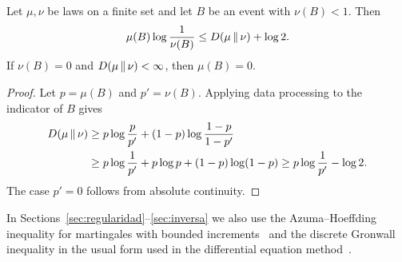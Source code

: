 \begin{lema}\label{lem:binaria} Let $\mu,\nu$ be laws on a finite set and let $B$ be an
event with $\nu(B)<1$. Then \[
 \mu(B)\log\frac1{\nu(B)}\le D(\mu\,\Vert\,\nu)+\log2 .
\] If $\nu(B)=0$ and $D(\mu\,\Vert\,\nu)<\infty$, then $\mu(B)=0$. \end{lema}

\begin{proof} Let $p=\mu(B)$ and $p'=\nu(B)$. Applying data processing to the indicator of $B$ gives \[
\begin{aligned}
 D(\mu\,\Vert\,\nu)&\ge p\log\frac p{p'}+(1-p)\log\frac{1-p}{1-p'}\\
 &\ge p\log\frac1{p'}+p\log p+(1-p)\log(1-p)\ge p\log\frac1{p'}-\log2 .
\end{aligned}
\] The case $p'=0$ follows from absolute continuity. \end{proof}

In Sections~\ref{sec:regularidad}--\ref{sec:inversa} we also use the Azuma--Hoeffding inequality for
martingales with bounded
increments~\cite{AlonSpencer} and the discrete Gronwall inequality in the usual form used in the
differential equation
method~\cite{Wormald,Warnke,BennettDudek}.
